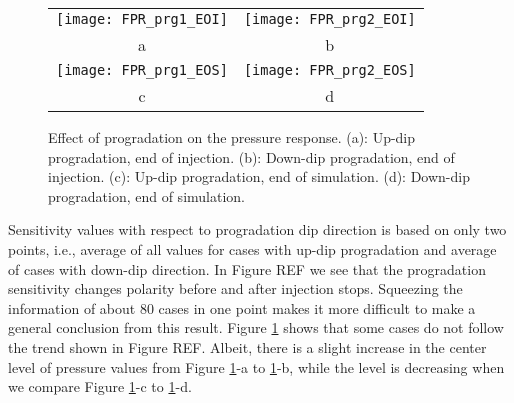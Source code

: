 \documentclass[english]{article}
\begin{document}
\begin{figure}


\begin{tabular}{cc}
\texttt{[image: FPR\_prg1\_EOI]} & 
\texttt{[image: FPR\_prg2\_EOI]}\\
a & b\\
\texttt{[image: FPR\_prg1\_EOS]} & 
\texttt{[image: FPR\_prg2\_EOS]}\\
c & d\\
\end{tabular}\caption{Effect of progradation on the pressure response. (a): Up-dip progradation,
end of injection. (b): Down-dip progradation, end of injection. (c):
Up-dip progradation, end of simulation. (d): Down-dip progradation,
end of simulation.}
\label{fig:progSens}
\end{figure}

Sensitivity values with respect to progradation dip direction is based on only two points, i.e., average of all values for cases with up-dip progradation and average of cases with down-dip direction. In Figure REF we see that the progradation sensitivity changes polarity before and after injection stops. Squeezing the information of about $80$ cases in one point makes it more difficult to make a general conclusion from this result. Figure \ref{fig:progSens} shows that some cases do not follow the trend shown in Figure REF. Albeit, there is a slight increase in the center level of pressure values from Figure \ref{fig:progSens}-a to \ref{fig:progSens}-b, while the level is decreasing when we compare Figure \ref{fig:progSens}-c to \ref{fig:progSens}-d.
\end{document}
